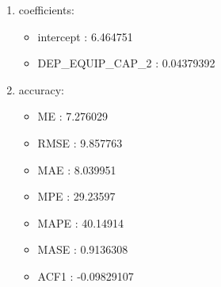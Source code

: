\documentclass[10pt,a4paper]{article}\usepackage[]{graphicx}\usepackage[]{color}
\newcommand{\AaA}{\_}
\begin{document}
\begin{multicols}{2}
\begin{enumerate}
\item coefficients:
\begin{itemize}
\item  intercept :  6.464751 
\item  DEP\AaA EQUIP\AaA CAP\AaA 2 :  0.04379392 
\end{itemize}
\item accuracy:
\begin{itemize}
\item  ME :  7.276029 
\item  RMSE :  9.857763 
\item  MAE :  8.039951 
\item  MPE :  29.23597 
\item  MAPE :  40.14914 
\item  MASE :  0.9136308 
\item  ACF1 :  -0.09829107 
\end{itemize}
\end{enumerate}
\end{multicols}
\end{document}
